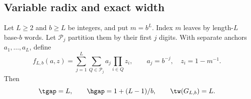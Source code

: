 \subsection{Variable radix and exact width}
\begin{theorem}\label{thm:variable-radix}
Let $L\ge2$ and $b\ge L$ be integers, and put $m=b^L$. Index $m$ leaves
by length-$L$ base-$b$ words. Let $\mathcal P_j$ partition them by their
first $j$ digits. With separate anchors $a_1,\ldots,a_L$, define
\[
 f_{L,b}(a,z)=\sum_{j=1}^L\sum_{Q\in\mathcal P_j}
                       a_j\prod_{i\in Q}z_i,
 \qquad a_j=b^{-j},\quad z_i=1-m^{-1}.
\]
Then
\begin{equation}\label{eq:radix-gaps}
 \tgap=L,\qquad \hgap=1+(L-1)/b,
 \qquad \tw(G_{L,b})=L.
\end{equation}
\end{theorem}
